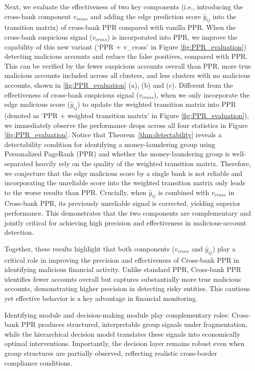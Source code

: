 Next, we evaluate the effectiveness of two key components (i.e., introducing the cross-bank component $v_{cross}$ and adding the edge prediction score $\hat{y}_{ij}$ into the transition matrix) of cross-bank PPR compared with vanilla PPR. When the cross-bank suspicious signal ($v_{cross}$) is incorporated into PPR, we improve the capability of this new variant (`PPR + v\_cross' in Figure \ref{fig:PPR_evaluation}) detecting malicious accounts and reduce the false positives, compared with PPR. This can be verified by the fewer suspicious accounts overall than PPR, more true malicious accounts included across all clusters, and less clusters with no malicious accounts, shown in \ref{fig:PPR_evaluation} (a), (b) and (c). Different from the effectiveness of cross-bank suspicious signal ($v_{cross}$), when we only incorporate the edge malicious score ($\hat{y}_{ij}$) to update the weighted transition matrix into PPR (denoted as `PPR + weighted transition matrix' in Figure \ref{fig:PPR_evaluation}), we immediately observe the performance drops across all four statistics in Figure \ref{fig:PPR_evaluation}. 
Notice that Theorem~\ref{thm:detectability} reveals a detectability condition for identifying a money-laundering group using Personalized PageRank (PPR) and whether the money-laundering group is well-separated heavily rely on the quality of the weighted transition matrix. Therefore, we conjecture that the edge malicious score by a single bank is not reliable and incorporating the unreliable score into the weighted transition matrix only leads to the worse results than PPR. Crucially, when $\hat{y}_{ij}$ is combined with $v_{cross}$ in Cross-bank PPR, its previously unreliable signal is corrected, yielding superior performance. This demonstrates that the two components are complementary and jointly critical for achieving high precision and effectiveness in malicious-account detection.

Together, these results highlight that both components ($v_{cross}$ and $\hat{y}_{ij}$) play a critical role in improving the precision and effectiveness of Cross-bank PPR in identifying malicious financial activity. Unlike standard PPR, Cross-bank PPR identifies fewer accounts overall but captures substantially more true malicious accounts, demonstrating higher precision in detecting risky entities. This cautious yet effective behavior is a key advantage in financial monitoring.

Identifying module and decision-making module play complementary roles: Cross-bank PPR produces structured, interpretable group signals under fragmentation, while the hierarchical decision model translates these signals into economically optimal interventions. Importantly, the decision layer remains robust even when group structures are partially observed, reflecting realistic cross-border compliance conditions. 


